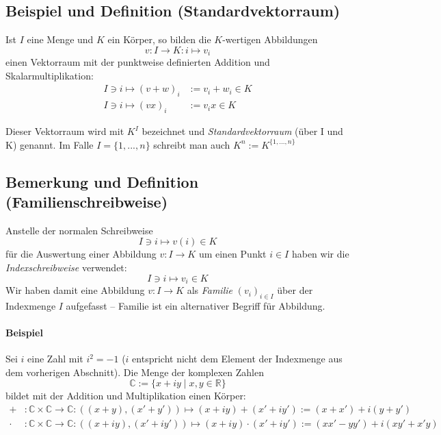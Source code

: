 \subsection{Beispiel und Definition (Standardvektorraum)}
	\begin{Definition}[Standardvektorraum]
		Ist $ I $ eine Menge und $ K $ ein Körper, so bilden die $ K $-wertigen Abbildungen
		\[ v: I \to K: i \mapsto v_i \]
	einen Vektorraum mit der punktweise definierten Addition und Skalarmultiplikation:
	\begin{align*}
		I\ni i \mapsto (v+w)_i &:= v_i+w_i\in K\\
		I\ni i \mapsto (vx)_i &:= v_ix \in K
	\end{align*}

	Dieser Vektorraum wird mit $K^{I}$ bezeichnet und \emph{Standardvektorraum} (über I und K) genannt. Im Falle $ I=\{1,...,n\} $ schreibt man auch $K^{n} := K^{\{1,...,n\}}$
	\end{Definition}

\subsection{Bemerkung und Definition (Familienschreibweise)}
	\begin{Definition}
		Anstelle der normalen Schreibweise
		\[ I\ni i \mapsto v(i) \in K \]
	für die Auswertung einer Abbildung  $v: I \to K$ um einen Punkt $i\in I$ haben wir die \emph{Indexschreibweise} verwendet:	
		\[ I\ni i \mapsto v_i \in K \]
	Wir haben damit eine Abbildung $v: I \to K$ als \emph{Familie} $ (v_i)_{i\in I} $ über der Indexmenge $ I $ aufgefasst -- Familie ist ein \glqq alternativer\grqq{} Begriff für Abbildung.
	\end{Definition}
	
\paragraph{Beispiel}
	Sei $i$ eine \glqq Zahl\grqq{} mit $i^2=-1$ ($i$ entspricht nicht dem Element der Indexmenge aus dem vorherigen Abschnitt). Die Menge der komplexen Zahlen
		\[ \mathbb{C}:=\{{x+iy\mid x,y\in \mathbb{R}}\} \]
	bildet mit der Addition und Multiplikation einen Körper:
	\begin{align*}
		+&:\mathbb{C}\times \mathbb{C} \to \mathbb{C}: ((x+y),(x'+y')) \mapsto (x+iy)+(x'+iy') := (x+x')+i(y+y')\\
		\cdot &:\mathbb{C}\times \mathbb{C} \to \mathbb{C}: ((x+iy),(x'+iy'))\mapsto (x+iy)\cdot (x'+iy') :=(xx'-yy')+i(xy'+x'y)
	\end{align*}


